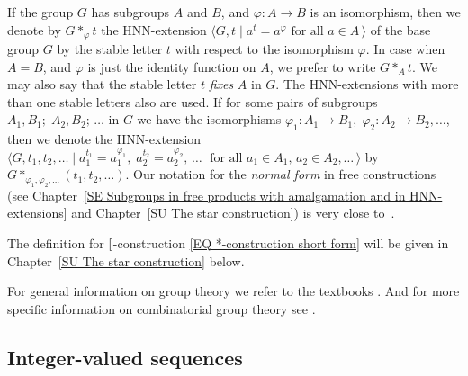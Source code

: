 \documentclass[12pt, a4paper]{amsart}
\newcommand{\1}{\{1\}}
\newcommand{\bigast}{\textrm{\footnotesize\ding{91}}}
\theoremstyle{plain}
\theoremstyle{definition}
\theoremstyle{remark}
\numberwithin{equation}{section}
\begin{document}
If the group $G$ has subgroups $A$ and $B$, and $\varphi : A \to B$ is an isomorphism, then we denote
 by $G*_{\varphi} t$ the HNN-extension $\langle G, t \mathrel{|} a^t=a^{\varphi} \text{ for all $a\in A$}\, \rangle$ of the base group $G$ 
by the stable letter $t$
with respect to the isomorphism 
$\varphi$.
In case when $A=B$, and $\varphi$ is just the identity function on $A$, we prefer to write $G*_{A} t$. We may also say that the stable letter $t$ \textit{fixes} $A$ in $G$.
The HNN-extensions with more than one stable letters also are used. If for some pairs of subgroups $A_1, B_1;\; A_2,B_2;\,\ldots$ in $G$ we have the isomorphisms $\varphi_1: A_1 \to B_1,\; \varphi_2: A_2 \to B_2,\ldots$, then  we denote the HNN-extension $\langle G, t_1, t_2,\ldots \mathrel{|} a_1^{t_1}=a_1^{\varphi_1}\!\!,\; a_2^{t_2}=a_2^{\varphi_2}\!\!,\,\ldots\; \text{ for all $a_1\in A_1$, $a_2\in A_2,\ldots$}\, \rangle$ by $G *_{\varphi_1, \varphi_2, \ldots} (t_1, t_2, \ldots)$. 
%
Our notation for the \textit{normal form} in
free constructions (see Chapter~\ref{SE Subgroups in free products with amalgamation and in HNN-extensions} and Chapter~\ref{SU The star construction}) is very close to~\cite{Bogopolski}.

The definition for $\bigast$-construction \eqref{EQ *-construction short form} will be given in Chapter~\ref{SU The star construction} below.

\medskip
For general information on group theory we refer to the textbooks \cite{Robinson, Kargapolov Merzljakov, Rotman}.
And for more specific information on combinatorial group theory see \cite{Lyndon Schupp, Bogopolski, De La Harpe 2000}.




















\subsection{Integer-valued sequences}
\label{SU Integer-valued sequences}
\end{document}
